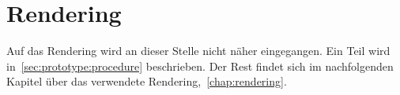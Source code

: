 
\section{Rendering}
\label{sec:prototype:rendering}

Auf das Rendering wird an dieser Stelle nicht näher eingegangen. Ein Teil wird
in~\ref{sec:prototype:procedure} beschrieben. Der Rest findet sich im
nachfolgenden Kapitel über das verwendete Rendering,~\ref{chap:rendering}.
